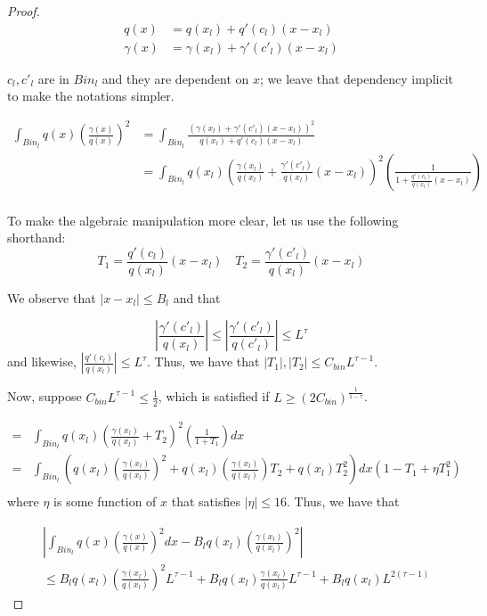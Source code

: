 \begin{proof}
\begin{align*}
q(x) &= q(x_l) + q'(c_l)(x-x_l)  \\
\gamma(x) &= \gamma(x_l) + \gamma'(c'_l)(x - x_l) 
\end{align*}

$c_l, c'_l$ are in $Bin_l$ and they are dependent on $x$; we leave that dependency implicit to make the notations simpler.  

\begin{align*}
\int_{Bin_l} q(x) \left( \frac{\gamma(x)}{q(x)} \right)^2 &=
  \int_{Bin_l} 
      \frac{ (\gamma(x_l) + \gamma'(c'_l)(x - x_l))^2  }{ q(x_l) + q'(c_l)(x-x_l)} 
  \\
&= \int_{Bin_l} q(x_l)
   \left( \frac{\gamma(x_l)}{q(x_l)} + \frac{\gamma'(c'_l)}{q(x_l)} (x - x_l) \right)^2
  \left( \frac{1}{1 + \frac{q'(c_l)}{q(x_l)} (x - x_l)} \right) \\
\end{align*}

To make the algebraic manipulation more clear, let us use the following shorthand:
\[
T_1 = \frac{q'(c_l)}{q(x_l)} ( x - x_l) \quad
T_2 = \frac{\gamma'(c'_l)}{q(x_l)} ( x - x_l) 
\]

We observe that $|x -x_l| \leq B_l$ and that

\[
\left| \frac{\gamma'(c'_l)}{q(x_l)} \right| 
    \leq \left| \frac{\gamma'(c'_l)}{q(c'_l)} \right| \leq L^\tau
\]
and likewise,  $\left| \frac{q'(c_l)}{q(x_l)} \right| \leq L^\tau$. Thus, we have that $|T_1|, |T_2| \leq C_{bin} L^{\tau -1}$.

Now, suppose $C_{bin} L^{\tau -1} \leq \frac{1}{2} $, which is satisfied if $L \geq (2 C_{bin})^{\frac{1}{1-\tau}}$. 

\begin{align*}
 =& \int_{Bin_l} q(x_l) 
       \left( \frac{\gamma(x_l)}{q(x_l)} + T_2 \right)^2 
        \left( \frac{1}{ 1 + T_1 } \right) dx  \\
 =& \int_{Bin_l} \left( q(x_l) \left( \frac{\gamma(x_l)}{q(x_l)} \right)^2 + 
                q(x_l) \left( \frac{\gamma(x_l)}{q(x_l)} \right) T_2 + q(x_l) T_2^2 \right) dx
    (1 - T_1 + \eta T_1^2) \\
\end{align*}
where $\eta$ is some function of $x$ that satisfies $|\eta| \leq 16$. Thus, we have that

\begin{align*}
& \left| \int_{Bin_l} q(x) \left( \frac{\gamma(x)}{q(x)} \right)^2 dx - 
      B_l q(x_l) \left( \frac{\gamma(x_l)}{q(x_l)} \right)^2 \right| \\
& \leq   B_l q(x_l) \left( \frac{\gamma(x_l)}{q(x_l)} \right)^2 L^{\tau-1} +
      B_l q(x_l) \frac{\gamma(x_l)}{q(x_l)} L^{\tau-1} + B_l q(x_l) L^{2(\tau-1)} 
\end{align*}


\end{proof}
